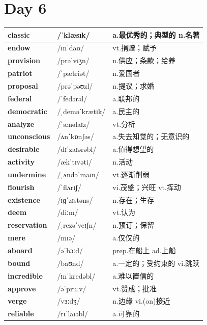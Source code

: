 \documentclass[14pt,a4paper]{extarticle}
\begin{document}
\section{Day 6}

\begin{longtable}{ p{} p{} p{} }
\hline
\endfirsthead
\hline
\endhead
\endfoot
\endlastfoot

\textbf{classic} & /ˈklæsɪk/ & a.最优秀的；典型的 \quad n.名著 \\ \hline
\textbf{endow} & /ɪnˈdaʊ/ & vt.捐赠；赋予 \\ \hline
\textbf{provision} & /prəˈvɪʒn/ & n.供应；条款；给养 \\ \hline
\textbf{patriot} & /ˈpætriət/ & n.爱国者 \\ \hline
\textbf{proposal} & /prəˈpəʊzl/ & n.提议；求婚 \\ \hline
\textbf{federal} & /ˈfedərəl/ & a.联邦的 \\ \hline
\textbf{democratic} & /ˌdeməˈkrætɪk/ & a.民主的 \\ \hline
\textbf{analyze} & /ˈænəlaɪz/ & vt.分析 \\ \hline
\textbf{unconscious} & /ʌnˈkɒnʃəs/ & a.失去知觉的；无意识的 \\ \hline
\textbf{desirable} & /dɪˈzaɪərəbl/ & a.值得想望的 \\ \hline
\textbf{activity} & /ækˈtɪvəti/ & n.活动 \\ \hline
\textbf{undermine} & /ˌʌndəˈmaɪn/ & vt.逐渐削弱 \\ \hline
\textbf{flourish} & /ˈflʌrɪʃ/ & vi.茂盛；兴旺 \quad vt.挥动 \\ \hline
\textbf{existence} & /ɪɡˈzɪstəns/ & n.存在；生存 \\ \hline
\textbf{deem} & /diːm/ & vt.认为 \\ \hline
\textbf{reservation} & /ˌrezəˈveɪʃn/ & n.预订；保留 \\ \hline
\textbf{mere} & /mɪə/ & a.仅仅的 \\ \hline
\textbf{aboard} & /əˈbɔːd/ & prep.在船上 \quad ad.上船 \\ \hline
\textbf{bound} & /baʊnd/ & a.一定的；受约束的 \quad vi.跳跃 \\ \hline
\textbf{incredible} & /ɪnˈkredəbl/ & a.难以置信的 \\ \hline
\textbf{approve} & /əˈpruːv/ & vt.赞成；批准 \\ \hline
\textbf{verge} & /vɜːdʒ/ & n.边缘 \quad vi.(on)接近 \\ \hline
\textbf{reliable} & /rɪˈlaɪəbl/ & a.可靠的 \\ \hline

\end{longtable}
\end{document}

